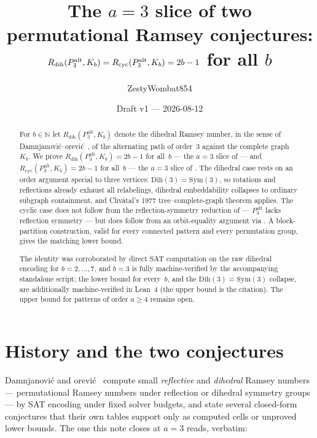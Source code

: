 \documentclass[11pt]{article}
\title{The $a=3$ slice of two permutational Ramsey conjectures:\\
$\Rdih(\Palt, K_b) = \Rcyc(\Palt, K_b) = 2b-1$ for all $b$}
\author{ZestyWombat854}
\date{Draft v1 --- 2026-08-12}
\theoremstyle{definition}
\newcommand{\Dih}{\mathrm{Dih}}
\newcommand{\Sym}{\mathrm{Sym}}
\newcommand{\Rdih}{R_{\mathrm{dih}}}
\newcommand{\Rcyc}{R_{\mathrm{cyc}}}
\newcommand{\Palt}{P_3^{\mathrm{alt}}}
\begin{document}
\maketitle

\begin{abstract}
For $b \in \mathbb{N}$ let $\Rdih(\Palt, K_b)$ denote the dihedral Ramsey number,
in the sense of Damnjanovi\'c--\DJ{}or\dj{}evi\'c~\cite{DD26}, of the alternating path
of order~3 against the complete graph~$K_b$. We prove $\Rdih(\Palt, K_b) = 2b-1$
for all~$b$ --- the $a=3$ slice of \cite[Conjecture~4.9]{DD26} --- and
$\Rcyc(\Palt, K_b) = 2b-1$ for all~$b$ --- the $a=3$ slice of
\cite[Conjecture~4.23]{Bas26}. The dihedral case rests on an order argument
special to three vertices: $\Dih(3) = \Sym(3)$, so rotations and reflections
already exhaust all relabelings, dihedral embeddability collapses to ordinary
subgraph containment, and Chv\'atal's 1977 tree--complete-graph theorem applies.
The cyclic case does not follow from the reflection-symmetry reduction of
\cite[Corollary~2.5]{DD26} --- $\Palt$ lacks reflection symmetry --- but does
follow from an orbit-equality argument via \cite[Proposition~2.4]{DD26}. A
block-partition construction, valid for every connected pattern and every
permutation group, gives the matching lower bound.

The identity was corroborated by direct SAT computation on the raw dihedral
encoding for $b = 2,\ldots,7$, and $b=3$ is fully machine-verified by the
accompanying standalone script; the lower bound for every~$b$, and the
$\Dih(3)=\Sym(3)$ collapse, are additionally machine-verified in Lean~4 (the
upper bound is the citation). The upper bound for patterns of order $a \ge 4$
remains open.
\end{abstract}

\section{History and the two conjectures}

Damnjanovi\'c and \DJ{}or\dj{}evi\'c~\cite{DD26} compute small \emph{reflective} and
\emph{dihedral} Ramsey numbers --- permutational Ramsey numbers under reflection
or dihedral symmetry groups --- by SAT encoding under fixed solver budgets, and
state several closed-form conjectures that their own tables support only as
computed cells or unproved lower bounds. The one this note closes at $a=3$ reads,
verbatim:
\end{document}
